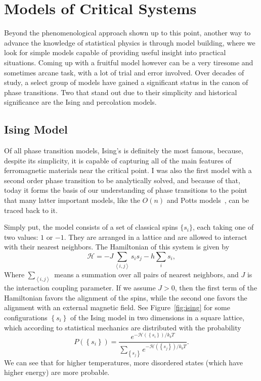 \section{Models of Critical Systems}
\label{sec:models}

Beyond the phenomenological approach shown up to this point, another way to
advance the knowledge of statistical physics is through model building, where
we look for simple models capable of providing useful insight into practical
situations. Coming up with a fruitful model however can be a very tiresome and
sometimes arcane task, with a lot of trial and error involved. Over decades of
study, a select group of models have gained a significant status in the canon
of phase transitions. Two that stand out due to their simplicity and historical
significance are the Ising and percolation models.


\subsection{Ising Model}
\label{sec:ising}

Of all phase transition models, Ising's is definitely the most famous, because,
despite its simplicity, it is capable of capturing all of the main features of
ferromagnetic materials near the critical point. I was also the first model
with a second order phase transition to be analytically solved, and because of
that, today it forms the basis of our understanding of phase transitions to
the point that many latter important models, like the $O(n)$ and Potts
models~\cite{Wu1982}, can be traced back to it.

Simply put, the model consists of a set of classical spins $\{s_i\}$, each
taking one of two values: $1$ or $-1$. They are arranged in a lattice and are
allowed to interact with their nearest neighbors. The Hamiltonian of this
system is given by
\begin{equation}
    \mathcal{H}=
    -J\sum_{\left\langle i,j\right\rangle }s_{i}s_{j}
    -h\sum_{i}s_{i},
\end{equation}
Where $\sum_{\left\langle i,j\right\rangle}$ means a summation over all pairs
of nearest neighbors, and $J$ is the interaction coupling parameter. If we
assume $J>0$, then the first term of the Hamiltonian favors the alignment of
the spins, while the second one favors the alignment with an external magnetic
field. See Figure~\ref{fig:ising} for some configurations $\left\{s_i\right\}$
of the Ising model in two dimensions in a square lattice, which according to
statistical mechanics are distributed with the probability
\begin{equation}
    P\left(\left\{ s_{i}\right\} \right)=
    \frac{e^{-\mathcal{H}\left(\left\{ s_{i}\right\} \right)/k_b T}}
         {\sum_{\left\{ s_{j}\right\} }
          e^{-\mathcal{H}\left(\left\{ s_{j}\right\} \right)/k_b T}}.
\end{equation}
We can see that for higher temperatures, more disordered states (which have
higher energy) are more probable.

